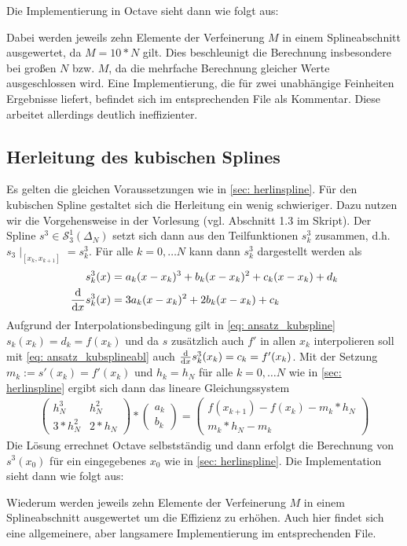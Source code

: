 \documentclass[a4paper, 11pt, ngerman]{scrartcl}
\begin{document}
Die Implementierung in Octave sieht dann wie folgt aus:
%

%
Dabei werden jeweils zehn Elemente der Verfeinerung $M$ in einem Splineabschnitt ausgewertet, da $M = 10 * N$ gilt. Dies beschleunigt die Berechnung insbesondere bei großen $N$ bzw. $M$, da die mehrfache Berechnung gleicher Werte ausgeschlossen wird. Eine Implementierung, die für zwei unabhängige Feinheiten Ergebnisse liefert, befindet sich im entsprechenden File als Kommentar. Diese arbeitet allerdings deutlich ineffizienter.

\subsection{Herleitung des kubischen Splines}
\label{sec: herkubspline}

Es gelten die gleichen Voraussetzungen wie in \cref{sec: herlinspline}. Für den kubischen Spline gestaltet sich die Herleitung ein wenig schwieriger. Dazu nutzen wir die Vorgehensweise in der Vorlesung (vgl. Abschnitt 1.3 im Skript). Der Spline $s^3 \in \mathcal{S}_3^1(\Delta_N)$ setzt sich dann aus den Teilfunktionen $s_k^3$ zusammen, d.h. $s_3 \mid_{[x_k, x_{k+1}]} = s_k^3$. Für alle $k = 0, \dots N$ kann dann $s_k^3$ dargestellt werden als 
\begin{align}
	s_k^3(x) &= a_k (x-x_k)^3 + b_k (x-x_k)^2 + c_k (x-x_k) + d_k \label{eq: ansatz_kubspline} \\ 
	\frac{\mathrm{d}}{\mathrm{d} x }{s_k^3} (x) &= 3a_k (x-x_k)^2 + 2b_k (x-x_k) + c_k  \label{eq: ansatz_kubsplineabl}
\end{align}
Aufgrund der Interpolationsbedingung gilt in \cref{eq: ansatz_kubspline} $s_k(x_k) = d_k = f(x_k)$ und da $s$ zusätzlich auch $f'$ in allen $x_k$ interpolieren soll mit \cref{eq: ansatz_kubsplineabl} auch $\frac{\mathrm{d}}{\mathrm{d} x }s_k^3(x_k) = c_k = f'(x_k)$. Mit der Setzung $m_k := s'(x_k) = f'(x_k)$ und $h_k = h_N$ für alle $k=0, \dots N$ wie in \cref{sec: herlinspline} ergibt sich dann das lineare Gleichungssystem
\begin{align}
	\begin{pmatrix} 	h_N^3 & h_N^2 \\ 3*h_N^2 & 2*h_N    \end{pmatrix} * \begin{pmatrix} a_k \\ b_k 	\end{pmatrix}
	= \begin{pmatrix} 	f(x_{k+1}) - f(x_k) - m_k*h_N \\ m_k * h_N - m_k  \end{pmatrix}
\end{align}
Die Lösung errechnet Octave selbstständig und dann erfolgt die Berechnung von $s^3(x_0)$ für ein eingegebenes $x_0$ wie in \cref{sec: herlinspline}.
Die Implementation sieht dann wie folgt aus:
%

%
Wiederum werden jeweils zehn Elemente der Verfeinerung $M$ in einem Splineabschnitt ausgewertet um die Effizienz zu erhöhen. Auch hier findet sich eine allgemeinere, aber langsamere Implementierung im entsprechenden File.
\end{document}
